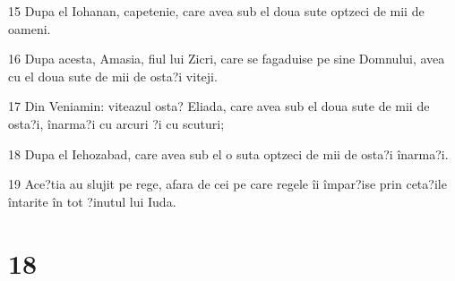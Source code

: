\par 15 Dupa el Iohanan, capetenie, care avea sub el doua sute optzeci de mii de oameni.
\par 16 Dupa acesta, Amasia, fiul lui Zicri, care se fagaduise pe sine Domnului, avea cu el doua sute de mii de osta?i viteji.
\par 17 Din Veniamin: viteazul osta? Eliada, care avea sub el doua sute de mii de osta?i, înarma?i cu arcuri ?i cu scuturi;
\par 18 Dupa el Iehozabad, care avea sub el o suta optzeci de mii de osta?i înarma?i.
\par 19 Ace?tia au slujit pe rege, afara de cei pe care regele îi împar?ise prin ceta?ile întarite în tot ?inutul lui Iuda.

\chapter{18}

